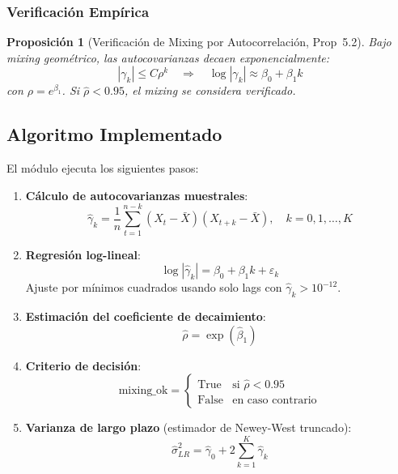 \documentclass[12pt,a4paper]{article}
\newtheorem{proposition}[theorem]{Proposición}
\begin{document}
\subsubsection{Verificación Empírica}

\begin{proposition}[Verificación de Mixing por Autocorrelación, Prop~5.2]
	Bajo mixing geométrico, las autocovarianzas decaen exponencialmente:
	\[
		|\gamma_k| \leq C \rho^k \quad \Rightarrow \quad \log|\gamma_k| \approx \beta_0 + \beta_1 k
	\]
	con $\rho = e^{\beta_1}$. Si $\hat{\rho} < 0.95$, el mixing se considera verificado.
\end{proposition}

\subsection{Algoritmo Implementado}

El módulo ejecuta los siguientes pasos:

\begin{enumerate}
	\item \textbf{Cálculo de autocovarianzas muestrales}:
	      \[
		      \hat{\gamma}_k = \frac{1}{n} \sum_{t=1}^{n-k} (X_t - \bar{X})(X_{t+k} - \bar{X}), \quad k = 0, 1, \dots, K
	      \]

	\item \textbf{Regresión log-lineal}:
	      \[
		      \log|\hat{\gamma}_k| = \beta_0 + \beta_1 k + \varepsilon_k
	      \]
	      Ajuste por mínimos cuadrados usando solo lags con $\hat{\gamma}_k > 10^{-12}$.

	\item \textbf{Estimación del coeficiente de decaimiento}:
	      \[
		      \hat{\rho} = \exp(\hat{\beta}_1)
	      \]

	\item \textbf{Criterio de decisión}:
	      \[
		      \text{mixing\_ok} = \begin{cases}
			      \text{True}  & \text{si } \hat{\rho} < 0.95 \\
			      \text{False} & \text{en caso contrario}
		      \end{cases}
	      \]

	\item \textbf{Varianza de largo plazo} (estimador de Newey-West truncado):
	      \[
		      \hat{\sigma}^2_{LR} = \hat{\gamma}_0 + 2\sum_{k=1}^{K} \hat{\gamma}_k
	      \]

\end{enumerate}
\end{document}
